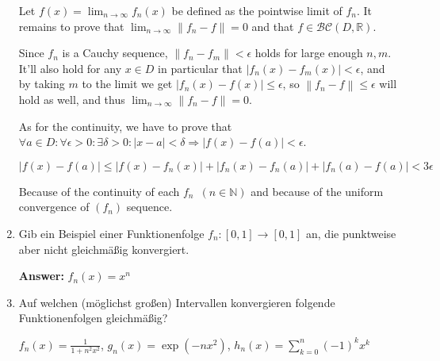 \documentclass[11pt]{article}
\newcommand{\norm}[1]{\left\lVert#1\right\rVert}
\newcommand{\abs}[1]{\left|#1\right|}
\begin{document}
\begin{enumerate}
Let $f(x) = \lim_{n\to\infty}f_n(x)$ be defined as the pointwise limit of $f_n$. It remains to prove that $\lim_{n\to\infty} \norm{f_n - f} = 0$ and that $f \in \mathcal{BC}(D,\mathbb{R})$.

Since $f_n$ is a Cauchy sequence, $\norm{f_n - f_m} < \epsilon$ holds for large enough $n,m$. It'll also hold for any $x\in D$ in particular that $\abs{f_n(x) - f_m(x)} < \epsilon$, and by taking $m$ to the limit we get $\abs{f_n(x) - f(x)} \le \epsilon$, so $\norm{f_n - f} \le \epsilon$ will hold as well, and thus $\lim_{n\to\infty}\norm{f_n - f} = 0$.

As for the continuity, we have to prove that $\forall a \in D\colon\forall \epsilon > 0\colon\exists\delta > 0\colon \abs{x - a} < \delta \Rightarrow \abs{f(x) - f(a)} < \epsilon$.


$$\abs{f(x) - f(a)} \le \abs{f(x) - f_n(x)} + \abs{f_n(x) - f_n(a)} + \abs{f_n(a) - f(a)} < 3\epsilon$$

Because of the continuity of each $f_n\phantom{0}(n \in \mathbb{N})$ and because of the uniform convergence of $(f_n)$ sequence.

\item Gib ein Beispiel einer Funktionenfolge $f_n\colon [0,1] \to [0,1]$ an, die punktweise aber nicht gleichmäßig konvergiert.

\textbf{Answer:} $f_n(x) = x^n$

\item Auf welchen (möglichst großen) Intervallen konvergieren folgende Funktionenfolgen gleichmäßig?

\begin{center}
    $f_n(x) = \frac{1}{1 + n^2 x^2}$, $g_n(x) = \exp(-nx^2)$, $h_n(x) = \sum_{k=0}^n{(-1)^k x^k}$
\end{center}


\end{enumerate}
\end{document}
